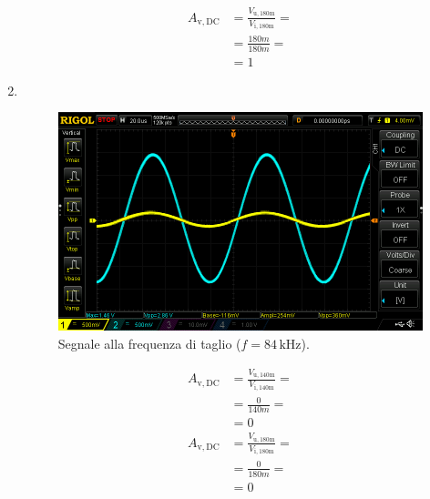 \documentclass[a4paper]{article}
\begin{document}
\begin{enumerate}[label=\alph*.]
\begin{equation*}
						\begin{split}
							A_{\mathrm{v, DC}} &= \frac{V_{\mathrm{u, 180m}}}{V_{\mathrm{i, 180m}}} = \\
											   &= \frac{180m}{180m} = \\
											   &= 1
						\end{split}
					\end{equation*}
				\item \ 
					\newline
					\newpage
					\begin{figure}[h!]
						\centering
						\includegraphics[scale=0.4]{frequenzaDiTaglioC5}
						\caption{Segnale alla frequenza di taglio ($ f = 84 \, \mathrm{kHz} $).}
						\label{fig:frequenzaDiTaglioC5}
					\end{figure}
					\newline
					\begin{equation*}
						\begin{split}
							A_{\mathrm{v, DC}} &= \frac{V_{\mathrm{u, 140m}}}{V_{\mathrm{i, 140m}}} = \\
											   &= \frac{0}{140m} = \\
											   &= 0
					\end{split}
					\end{equation*}
					\begin{equation*}
						\begin{split}
							A_{\mathrm{v, DC}} &= \frac{V_{\mathrm{u, 180m}}}{V_{\mathrm{i, 180m}}} = \\
											   &= \frac{0}{180m} = \\
											   &= 0
						\end{split}
					\end{equation*}
			\end{enumerate}
\end{document}
